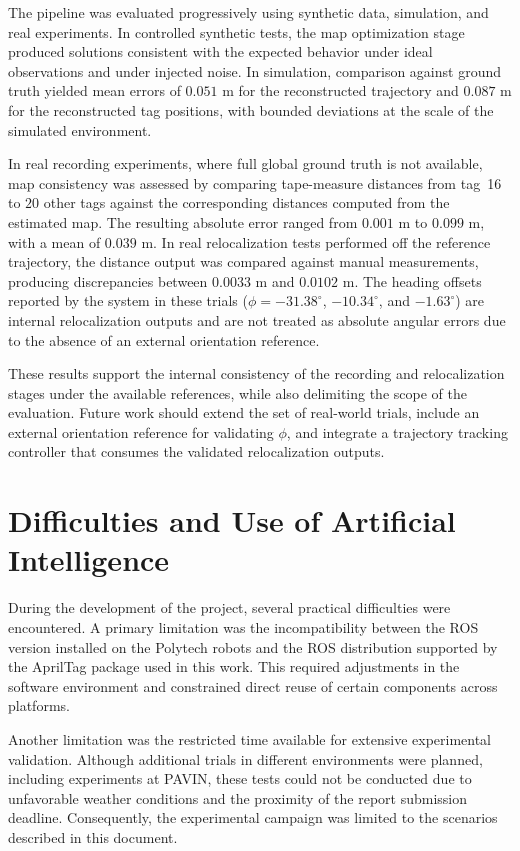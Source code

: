 \documentclass[a4paper,11pt]{article}
\begin{document}
The pipeline was evaluated progressively using synthetic data, simulation, and real experiments. In controlled synthetic tests, the map optimization stage produced solutions consistent with the expected behavior under ideal observations and under injected noise. In simulation, comparison against ground truth yielded mean errors of $0.051\text{ m}$ for the reconstructed trajectory and $0.087\text{ m}$ for the reconstructed tag positions, with bounded deviations at the scale of the simulated environment.

In real recording experiments, where full global ground truth is not available, map consistency was assessed by comparing tape-measure distances from tag~16 to $20$ other tags against the corresponding distances computed from the estimated map. The resulting absolute error ranged from $0.001\text{ m}$ to $0.099\text{ m}$, with a mean of $0.039\text{ m}$. In real relocalization tests performed off the reference trajectory, the distance output was compared against manual measurements, producing discrepancies between $0.0033\text{ m}$ and $0.0102\text{ m}$. The heading offsets reported by the system in these trials ($\phi=-31.38^\circ$, $-10.34^\circ$, and $-1.63^\circ$) are internal relocalization outputs and are not treated as absolute angular errors due to the absence of an external orientation reference.

These results support the internal consistency of the recording and relocalization stages under the available references, while also delimiting the scope of the evaluation. Future work should extend the set of real-world trials, include an external orientation reference for validating $\phi$, and integrate a trajectory tracking controller that consumes the validated relocalization outputs.

\section{Difficulties and Use of Artificial Intelligence}

During the development of the project, several practical difficulties were encountered. A primary limitation was the incompatibility between the ROS version installed on the Polytech robots and the ROS distribution supported by the AprilTag package used in this work. This required adjustments in the software environment and constrained direct reuse of certain components across platforms.

Another limitation was the restricted time available for extensive experimental validation. Although additional trials in different environments were planned, including experiments at PAVIN, these tests could not be conducted due to unfavorable weather conditions and the proximity of the report submission deadline. Consequently, the experimental campaign was limited to the scenarios described in this document.
\end{document}
